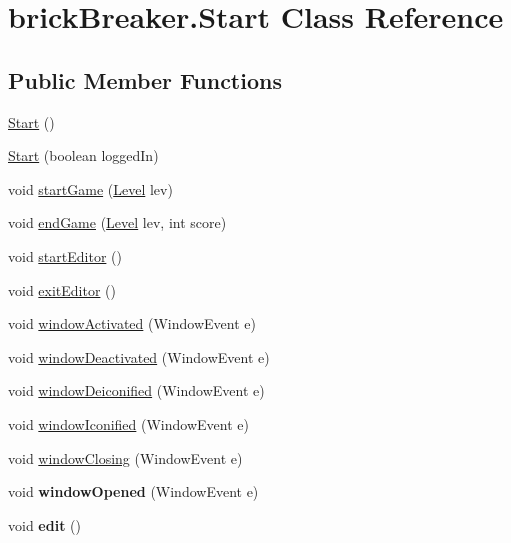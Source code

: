 \hypertarget{classbrick_breaker_1_1_start}{
\section{brickBreaker.Start Class Reference}
\label{classbrick_breaker_1_1_start}
}
\subsection*{Public Member Functions}
\begin{DoxyCompactItemize}
\item 
\hyperlink{classbrick_breaker_1_1_start_a280dfb1c2f596271d773aa1bdb777b20}{Start} ()
\item 
\hyperlink{classbrick_breaker_1_1_start_add9cb12f31b41a4c48a9631e3b813bfc}{Start} (boolean loggedIn)
\item 
void \hyperlink{classbrick_breaker_1_1_start_afe4437abe9e58312599f173ef8cc3033}{startGame} (\hyperlink{classbrick_breaker_1_1_level}{Level} lev)
\item 
void \hyperlink{classbrick_breaker_1_1_start_a794a63dad7a962820d9dd5bf26bf2e35}{endGame} (\hyperlink{classbrick_breaker_1_1_level}{Level} lev, int score)
\item 
void \hyperlink{classbrick_breaker_1_1_start_a398e72365f82fe4214ea3534bfa34270}{startEditor} ()
\item 
void \hyperlink{classbrick_breaker_1_1_start_af99a0afe969ad087b6315a19e8b2289c}{exitEditor} ()
\item 
void \hyperlink{classbrick_breaker_1_1_start_a8a00f5a3b3b443b9d54ea98808ffab37}{windowActivated} (WindowEvent e)
\item 
void \hyperlink{classbrick_breaker_1_1_start_ac2c1907f281e5cc6abf558789c8946b3}{windowDeactivated} (WindowEvent e)
\item 
void \hyperlink{classbrick_breaker_1_1_start_a7a77b64bcea5b507ae49463baa3f0282}{windowDeiconified} (WindowEvent e)
\item 
void \hyperlink{classbrick_breaker_1_1_start_aaadc30e22fd645a756381bedd0c35c9e}{windowIconified} (WindowEvent e)
\item 
void \hyperlink{classbrick_breaker_1_1_start_a11168f9afbcfc8cac2b7570a3a0dfa09}{windowClosing} (WindowEvent e)
\item 
\hypertarget{classbrick_breaker_1_1_start_a0c42ef06bf5158b92edc91d34ee5c038}{
void {\bfseries windowOpened} (WindowEvent e)}
\label{classbrick_breaker_1_1_start_a0c42ef06bf5158b92edc91d34ee5c038}

\item 
\hypertarget{classbrick_breaker_1_1_start_a988d6bb03340ad92e27da5a3b6bef95d}{
void {\bfseries edit} ()}
\label{classbrick_breaker_1_1_start_a988d6bb03340ad92e27da5a3b6bef95d}

\end{DoxyCompactItemize}
